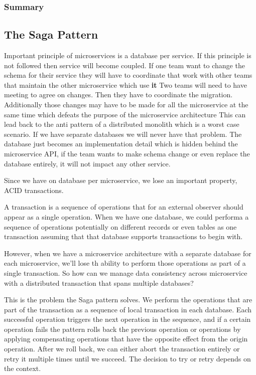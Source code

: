 \subsubsection{Summary}

\subsection{The Saga Pattern}
Important principle of microservices is a database per service.
If this principle is not followed then service will become coupled.
If one team want to change the schema for their service they will have to coordinate that work with other teams that maintain the other microservice which use \textbf{it}
Two teams will need to have meeting to agree on changes.
Then they have to coordinate the migration.
Additionally those changes may have to be made for all the microservice at the same time which defeats the purpose of the microservice architecture
This can lead back to the anti pattern of a distributed monolith which is a worst case scenario.
If we have separate databases we will never have that problem.
The database just becomes an implementation detail which is hidden behind the microservice API, if the team wants to make schema change or even replace the database entirely, it will not impact any other service.

Since we have on database per microservice, we lose an important property, ACID transactions.

A transaction is a sequence of operations that for an external observer should appear as a single operation.
When we have one database, we could performa a sequence of operations potentially on different records or even tables as one transaction assuming that that database supports transactions to begin with.

However, when we have a microservice architecture with a separate database for each microservice, we'll lose th ability to perform those operations as part of a single transaction.
So how can we manage data consistency across microservice with a distributed transaction that spans multiple databases?

This is the problem the Saga pattern solves.
We perform the operations that are part of the transaction as a sequence of local transaction in each database.
Each successful operation triggers the next operation in the sequence, and if a certain operation fails the pattern rolls back the previous operation or operations by applying compensating operations that have the opposite effect from the origin operation.
After we roll back, we can either abort the transaction entirely or retry it multiple times until we succeed.
The decision to try or retry depends on the context.

